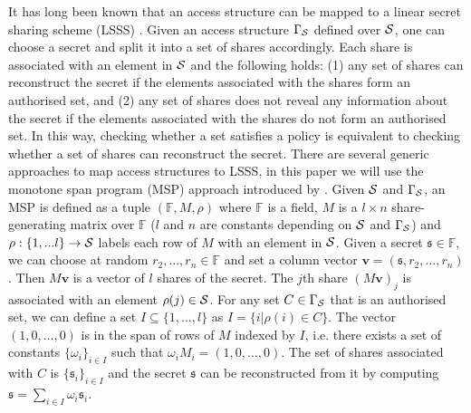 It has long been known that an access structure can be mapped to a linear secret sharing scheme (LSSS) \cite{ito89,bei96}. Given an access structure $\Gamma_\mathcal{S}$ defined over $\mathcal{S}$, one can choose a secret and split it into a set of shares accordingly. 
Each share is associated with an element in $\mathcal{S}$ and the following holds: 
(1) any set of shares can reconstruct the secret if the elements associated with the shares form an authorised set, and 
(2) any set of shares does not reveal any information about the secret if the elements associated with the shares do not form an authorised set.
In this way, checking whether a set satisfies a policy is equivalent to checking whether a set of shares can reconstruct the secret. 
There are several generic approaches to map access structures to LSSS, in this paper we will use the monotone span program (MSP) approach introduced by \citet{bei96}. 
Given $\mathcal{S}$ and $\Gamma_\mathcal{S}$, an MSP is defined as a tuple $(\mathbb{F},M,\rho)$ where $\mathbb{F}$ is a field, $M$ is a $l\times n$ share-generating matrix over $\mathbb{F}$ ($l$ and $n$ are constants depending on  $\mathcal{S}$ and $\Gamma_\mathcal{S}$) and $\rho:\{1,...l\}\rightarrow \mathcal{S}$ labels each row of $M$ with an element in $\mathcal{S}$. 
Given a secret $\mathfrak{s}\in \mathbb{F}$, we can choose at random $r_2,\ldots,r_n \in \mathbb{F}$ and set a column vector $\mathbf{v}=(\mathfrak{s},r_2,\ldots,r_n)$. 
Then $M\mathbf{v}$ is a vector of $l$ shares of the secret. 
The $j$th share $(M\mathbf{v})_{j}$ is associated with an element $\rho(j) \in \mathcal{S}$. 
For any set $C\in \Gamma_\mathcal{S}$ that is an authorised set, we can define a set $I\subseteq \{1,\ldots,l\}$ as $I=\{i|\rho(i)\in C\}$. 
The vector $(1,0,\ldots,0)$ is in the span of rows of $M$ indexed by $I$, i.e. there exists a set of constants $\{\omega_i\}_{i\in I}$ such that $\omega_iM_i=(1,0,\ldots,0)$. 
The set of shares associated with $C$ is $\{\mathfrak{s}_i\}_{i\in I}$ and the secret $\mathfrak{s}$ can be reconstructed from it by computing $\mathfrak{s}=\sum_{i\in I}\omega_i\mathfrak{s}_i$.


